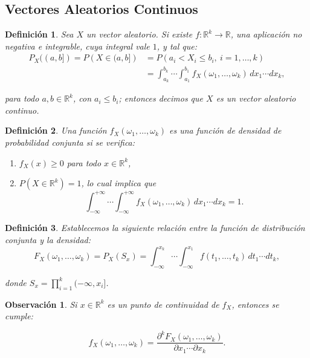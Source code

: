 \documentclass{report}
\newtheorem{dfn}{Definición}[section]
\newtheorem{obs}{Observación}[section]
\begin{document}
\subsection{Vectores Aleatorios Continuos}
\begin{dfn}
    Sea $X$ un vector aleatorio. Si existe $f:\mathbb{R}^k\rightarrow\mathbb{R}$, una aplicación no negativa e integrable, cuya integral vale $1$, y tal que:
\[
\begin{split}
    P_X((a, b]) = P\left( X \in (a, b] \right) &= P\left( a_i < X_i \leq b_i, \ i = 1, \dots, k \right) \\
    &= \int_{a_k}^{b_k} \cdots \int_{a_1}^{b_1} f_X(\omega_1, \dots, \omega_k) \, dx_1 \cdots dx_k,
\end{split}
\]

para todo $a,b\in\mathbb{R}^k$, con $a_i\leq b_i$; entonces decimos que $X$ es un \emph{vector aleatorio continuo}.
\end{dfn}

\begin{dfn}
Una función \( f_X(\omega_1, \dots, \omega_k) \) es una \textit{función de densidad de probabilidad conjunta} si se verifica:

\begin{enumerate}
    \item \( f_X(x) \geq 0 \) para todo \( x \in \mathbb{R}^k \),
    \item \( P(X \in \mathbb{R}^k) = 1 \), lo cual implica que
    \[
    \int_{-\infty}^{+\infty} \cdots \int_{-\infty}^{+\infty} f_X(\omega_1, \dots, \omega_k) \, dx_1 \cdots dx_k = 1.
    \]
\end{enumerate}
\end{dfn}


\begin{dfn}
   Establecemos la siguiente relación entre la función de distribución conjunta y la densidad:
\begin{equation*}
F_X(\omega_1, \dots, \omega_k) = P_X(S_x) = \int_{-\infty}^{x_k} \cdots \int_{-\infty}^{x_1} f(t_1, \dots, t_k) \, dt_1 \cdots dt_k,
\end{equation*}

donde \( S_x = \prod_{i=1}^{k} (-\infty, x_i] \).
\end{dfn}

\begin{obs}
Si \( x \in \mathbb{R}^k \) es un punto de continuidad de \( f_X \), entonces se cumple:

\begin{equation*}
f_X(\omega_1, \dots, \omega_k) = \frac{\partial^k F_X(\omega_1, \dots, \omega_k)}{\partial x_1 \cdots \partial x_k}.
\end{equation*}
\end{obs}
\end{document}
